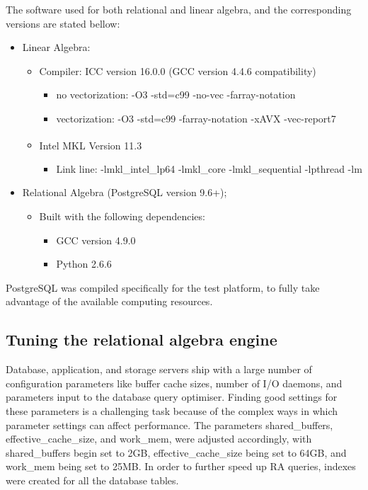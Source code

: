 The software used for both relational and linear algebra, and the corresponding versions are stated bellow:

\begin{itemize}
\item Linear Algebra: 
    \begin{itemize}
    \item Compiler: ICC version 16.0.0 (GCC version 4.4.6 compatibility)
    \begin{itemize}
        \item no vectorization: -O3 -std=c99 -no-vec -farray-notation 
        \item vectorization: -O3 -std=c99 -farray-notation -xAVX -vec-report7
    \end{itemize}
    \item Intel\textsuperscript{\textregistered} MKL Version	11.3
    \begin{itemize}
        \item Link line: -lmkl\_intel\_lp64 -lmkl\_core -lmkl\_sequential -lpthread -lm
    \end{itemize}
        \end{itemize}

\vspace{0.35cm}
    \item Relational Algebra (PostgreSQL version 9.6+);
    \begin{itemize}
        \item Built with the following dependencies:
        \begin{itemize}
            \item GCC version 4.9.0
            \item Python 2.6.6
        \end{itemize}
           \end{itemize}
\end{itemize}

PostgreSQL was compiled specifically for the test platform, to fully take advantage of the available computing resources. 

\subsection{Tuning the relational algebra engine}
Database, application, and storage servers ship with a large number of configuration parameters like buffer cache sizes, number of I/O daemons, and parameters input to the database query optimiser. Finding good settings for these parameters is a challenging task because of the complex ways in which parameter settings can affect performance. The parameters shared\_buffers, effective\_cache\_size, and work\_mem, were adjusted accordingly, with  shared\_buffers begin set to 2GB, effective\_cache\_size being set to 64GB, and work\_mem being set to 25MB. In order to further speed up RA queries, indexes were created for all the database tables.


